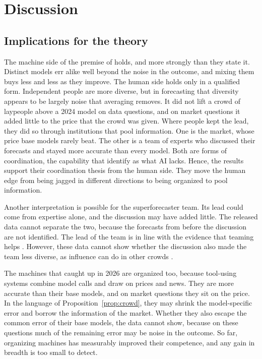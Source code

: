 \documentclass[11pt,a4paper]{article}
\theoremstyle{definition}
\begin{document}
\section{Discussion}\label{sec:discussion}

\subsection{Implications for the theory}

The machine side of the premise of \citet{imas2026organizing} holds, and more strongly than they state it. Distinct models err alike well beyond the noise in the outcome, and mixing them buys less and less as they improve. The human side holds only in a qualified form. Independent people are more diverse, but in forecasting that diversity appears to be largely noise that averaging removes. It did not lift a crowd of laypeople above a 2024 model on data questions, and on market questions it added little to the price that the crowd was given. Where people kept the lead, they did so through institutions that pool information. One is the market, whose price base models rarely beat. The other is a team of experts who discussed their forecasts and stayed more accurate than every model. Both are forms of coordination, the capability that \citet{imas2026organizing} identify as what AI lacks. Hence, the results support their coordination thesis from the human side. They move the human edge from being jagged in different directions to being organized to pool information.

Another interpretation is possible for the superforecaster team. Its lead could come from expertise alone, and the discussion may have added little. The released data cannot separate the two, because the forecasts from before the discussion are not identified. The lead of the team is in line with the evidence that teaming helps \citep{mellers2014psychological}. However, these data cannot show whether the discussion also made the team less diverse, as influence can do in other crowds \citep{lorenz2011social}.

The machines that caught up in 2026 are organized too, because tool-using systems combine model calls and draw on prices and news. They are more accurate than their base models, and on market questions they sit on the price. In the language of Proposition~\ref{prop:crowd}, they may shrink the model-specific error and borrow the information of the market. Whether they also escape the common error of their base models, the data cannot show, because on these questions much of the remaining error may be noise in the outcome. So far, organizing machines has measurably improved their competence, and any gain in breadth is too small to detect.
\end{document}
